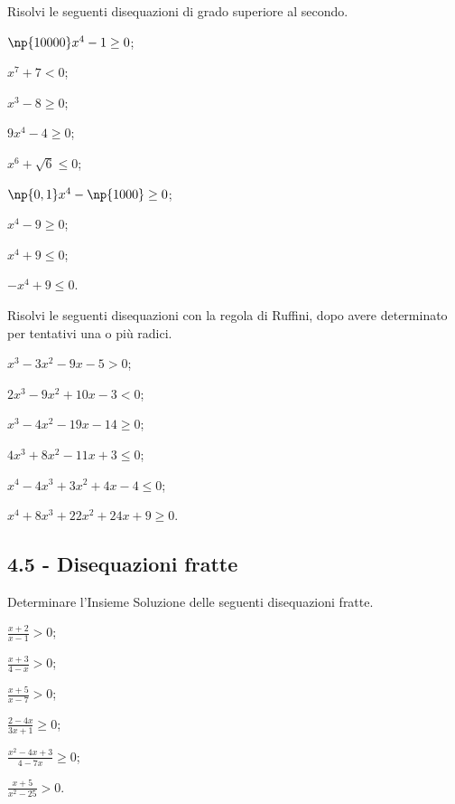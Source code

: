 \begin{esercizio}[\Ast]
 \label{ese:4.49}
Risolvi le seguenti disequazioni di grado superiore al secondo.
\begin{multicols}{3}
\begin{enumeratea}
\item $\np{10000}x^4-1\ge 0$;
\item $x^7+7<0$;
\item $x^3-8\ge 0$;
\item $9x^4-4\ge 0$;
\item $x^6+\sqrt 6\le 0$;
\item $\np{0,1}x^4-\np{1000}\ge 0$;
\item $x^4-9\ge 0$;
\item $x^4+9\le 0$;
\item $-x^4+9\le 0$.
\end{enumeratea}
\end{multicols}
\end{esercizio}

\begin{esercizio}[\Ast]
 \label{ese:4.50}
Risolvi le seguenti disequazioni con la regola di Ruffini, dopo avere determinato per tentativi una o più radici.
\begin{multicols}{2}
\begin{enumeratea}
\item $x^{3}-3x^{2}-9x-5>0$;
\item $2x^{3}-9x^{2}+10x-3<0$;
\item $x^{3}-4x^{2}-19x-14\ge 0$;
\item $4x^{3}+8x^{2}-11x+3\le 0$;
\item $x^{4}-4x^{3}+3x^{2}+4x-4\le 0$;
\item $x^{4}+8x^{3}+22x^{2}+24x+9\ge 0$.
\end{enumeratea}
\end{multicols}
\end{esercizio}

\subsection*{4.5 - Disequazioni fratte}

\begin{esercizio}[\Ast]
 \label{ese:4.51}
Determinare l'Insieme Soluzione delle seguenti disequazioni fratte.
\begin{multicols}{3}
\begin{enumeratea}
\item $\frac{x+2}{x-1}>0$;
\item $\frac{x+3}{4-x}>0$;
\item $\frac{x+5}{x-7}>0$;
\item $\frac{2-4x}{3x+1}\ge 0$;
\item $\frac{x^2-4x+3}{4-7x}\ge 0$;
\item $\frac{x+5}{x^2-25}>0$.
\end{enumeratea}
\end{multicols}
\end{esercizio}

